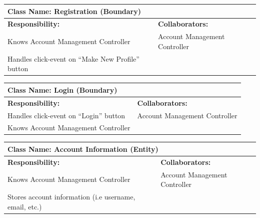 \documentclass[]{article}
\begin{document}
\begin{table}[H]
  \centering
  \renewcommand{\arraystretch}{1.3} %
  \begin{tabular}{|p{7.5cm}|p{7.5cm}|}
    \hline
    \multicolumn{2}{|l|}{\textbf{Class Name: Registration (Boundary)}}               \\
    \hline
    \textbf{Responsibility:}                         & \textbf{Collaborators:}       \\
    \hline
    Knows Account Management Controller              & Account Management Controller \\
    Handles click-event on “Make New Profile” button &                               \\
    \hline
  \end{tabular}
\end{table}
\begin{table}[H]
  \centering
  \renewcommand{\arraystretch}{1.3} %
  \begin{tabular}{|p{7.5cm}|p{7.5cm}|}
    \hline
    \multicolumn{2}{|l|}{\textbf{Class Name: Login (Boundary)}}           \\
    \hline
    \textbf{Responsibility:}              & \textbf{Collaborators:}       \\
    \hline
    Handles click-event on “Login” button & Account Management Controller \\
    Knows Account Management Controller   &                               \\
    \hline
  \end{tabular}
\end{table}
\begin{table}[H]
  \centering
  \renewcommand{\arraystretch}{1.3} %
  \begin{tabular}{|p{7.5cm}|p{7.5cm}|}
    \hline
    \multicolumn{2}{|l|}{\textbf{Class Name: Account Information (Entity)}}                \\
    \hline
    \textbf{Responsibility:}                               & \textbf{Collaborators:}       \\
    \hline
    Knows Account Management Controller                    & Account Management Controller \\
    Stores account information (i.e username, email, etc.) &                               \\
    \hline
  \end{tabular}
\end{table}
\end{document}
